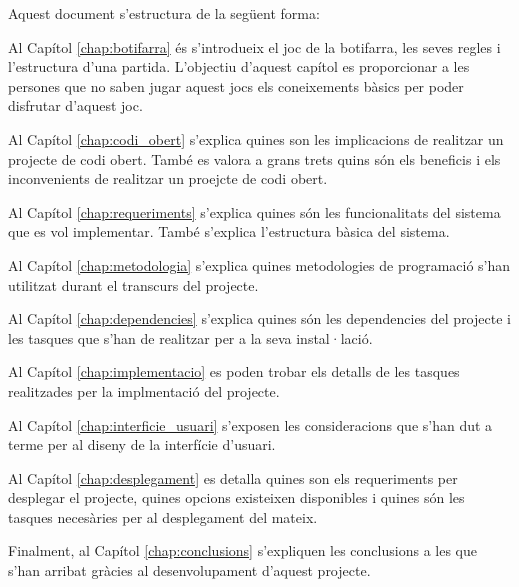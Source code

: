 Aquest document s'estructura de la següent forma: 

Al Capítol \ref{chap:botifarra} és s'introdueix el joc de la botifarra, les seves regles i l'estructura d'una partida. L'objectiu d'aquest capítol es proporcionar a les persones que no saben jugar aquest jocs els coneixements bàsics per poder disfrutar d'aquest joc. 

Al Capítol \ref{chap:codi_obert} s'explica quines son les implicacions de realitzar un projecte de codi obert. També es valora a grans trets quins són els beneficis i els inconvenients de realitzar un proejcte de codi obert.

Al Capítol \ref{chap:requeriments} s'explica quines són les funcionalitats del sistema que es vol implementar. També s'explica l'estructura bàsica del sistema. 

Al Capítol \ref{chap:metodologia} s'explica quines metodologies de programació s'han utilitzat durant el transcurs del projecte.

Al Capítol \ref{chap:dependencies} s'explica quines són les dependencies del projecte i les tasques que s'han de realitzar per a la seva instal·lació. 

Al Capítol \ref{chap:implementacio} es poden trobar els detalls de les tasques realitzades per la implmentació del projecte. 

Al Capítol \ref{chap:interficie_usuari} s'exposen les consideracions que s'han dut a terme per al diseny de la interfície d'usuari.

Al Capítol \ref{chap:desplegament} es detalla quines son els requeriments per desplegar el projecte, quines opcions existeixen disponibles i quines són les tasques necesàries per al desplegament del mateix. 

Finalment, al Capítol \ref{chap:conclusions} s'expliquen les conclusions a les que s'han arribat gràcies al desenvolupament d'aquest projecte. 
